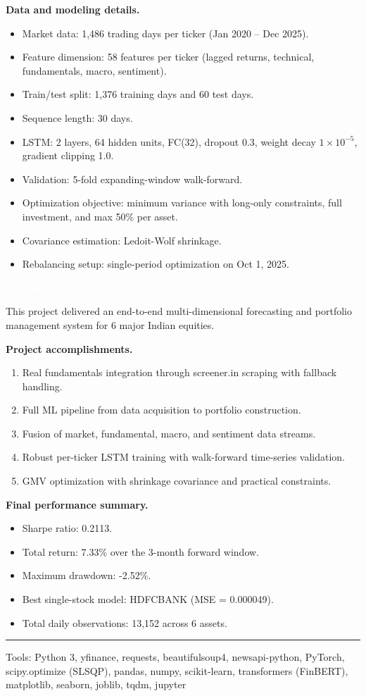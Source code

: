 \documentclass[10pt,a4paper]{article}
\newcommand{\SectionBar}[1]{%
  \vspace{0.35em}
  \noindent\colorbox{ReportBlue}{%
    \parbox{\dimexpr\linewidth-2\fboxsep\relax}{%
      \vspace{2.5pt}\textcolor{white}{\bfseries\footnotesize #1}\vspace{2.5pt}
    }%
  }%
  \vspace{0.35em}
}
\newcommand{\FooterText}{Tools: Python 3, yfinance, requests, beautifulsoup4, newsapi-python, PyTorch, scipy.optimize (SLSQP), pandas, numpy, scikit-learn, transformers (FinBERT), matplotlib, seaborn, joblib, tqdm, jupyter}
\begin{document}
{\textbf{Data and modeling details.}
\begin{itemize}
  \item Market data: 1,486 trading days per ticker (Jan 2020 -- Dec 2025).
  \item Feature dimension: 58 features per ticker (lagged returns, technical, fundamentals, macro, sentiment).
  \item Train/test split: 1,376 training days and 60 test days.
  \item Sequence length: 30 days.
  \item LSTM: 2 layers, 64 hidden units, FC(32), dropout 0.3, weight decay $1\times10^{-5}$, gradient clipping 1.0.
  \item Validation: 5-fold expanding-window walk-forward.
  \item Optimization objective: minimum variance with long-only constraints, full investment, and max 50\% per asset.
  \item Covariance estimation: Ledoit-Wolf shrinkage.
  \item Rebalancing setup: single-period optimization on Oct 1, 2025.
\end{itemize}
}

\SectionBar{Conclusion}
{\fontsize{8}{10.3}\selectfont\justifying
This project delivered an end-to-end multi-dimensional forecasting and portfolio management system for 6 major Indian equities.

\textbf{Project accomplishments.}
\begin{enumerate}
  \item Real fundamentals integration through screener.in scraping with fallback handling.
  \item Full ML pipeline from data acquisition to portfolio construction.
  \item Fusion of market, fundamental, macro, and sentiment data streams.
  \item Robust per-ticker LSTM training with walk-forward time-series validation.
  \item GMV optimization with shrinkage covariance and practical constraints.
\end{enumerate}

\textbf{Final performance summary.}
\begin{itemize}
  \item Sharpe ratio: 0.2113.
  \item Total return: 7.33\% over the 3-month forward window.
  \item Maximum drawdown: -2.52\%.
  \item Best single-stock model: HDFCBANK (MSE = 0.000049).
  \item Total daily observations: 13,152 across 6 assets.
\end{itemize}
}

\vspace{6pt}
\noindent\textcolor{MidGray}{\rule{\linewidth}{0.8pt}}
\vspace{2pt}
\begin{center}
  {\fontsize{6.5}{8}\selectfont\textcolor{FooterGray}{\FooterText}}
\end{center}
\end{document}
